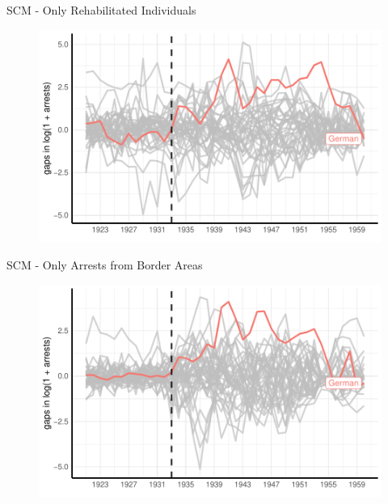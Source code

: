 \documentclass[11pt]{beamer}
\begin{document}
\begin{frame}[label=sc_rehabs]{SCM - Only Rehabilitated Individuals}
 \begin{figure}[h]
\centering
\includegraphics[width=1\textwidth]{placebo_highlight_all_rehabs.pdf}
\end{figure}
\hyperlink{sc_robustness_checks}{}
\end{frame}

\begin{frame}[label=sc_border_area]{SCM - Only Arrests from Border Areas}
 \begin{figure}[h]
\centering
\includegraphics[width=1\textwidth]{placebo_highlight_all_border_provinces.pdf}
\end{figure}
\hyperlink{sc_robustness_checks}{}
\end{frame}
\end{document}
